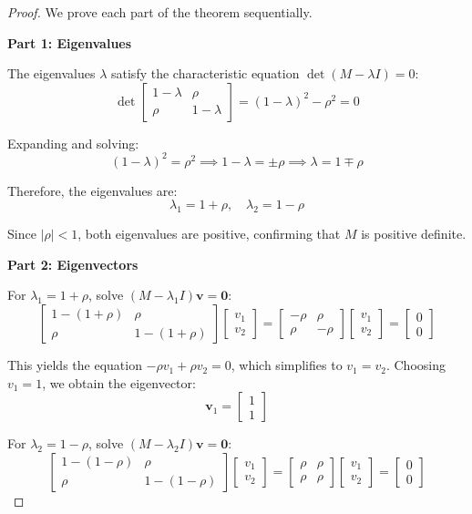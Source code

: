 \documentclass{article}
\begin{document}
\begin{proof}
We prove each part of the theorem sequentially.

\textbf{Part 1: Eigenvalues}

The eigenvalues $\lambda$ satisfy the characteristic equation $\det(M - \lambda I) = 0$:
\[
\det\begin{bmatrix} 
1-\lambda & \rho \\ 
\rho & 1-\lambda 
\end{bmatrix} = (1-\lambda)^2 - \rho^2 = 0
\]

Expanding and solving:
\[
(1-\lambda)^2 = \rho^2 \implies 1-\lambda = \pm\rho \implies \lambda = 1 \mp \rho
\]

Therefore, the eigenvalues are:
\[
\lambda_1 = 1 + \rho, \quad \lambda_2 = 1 - \rho
\]

Since $|\rho| < 1$, both eigenvalues are positive, confirming that $M$ is positive definite.

\textbf{Part 2: Eigenvectors}

For $\lambda_1 = 1 + \rho$, solve $(M - \lambda_1 I)\mathbf{v} = \mathbf{0}$:
\[
\begin{bmatrix}
1-(1+\rho) & \rho \\
\rho & 1-(1+\rho)
\end{bmatrix}
\begin{bmatrix} v_1 \\ v_2 \end{bmatrix}
=
\begin{bmatrix}
-\rho & \rho \\
\rho & -\rho
\end{bmatrix}
\begin{bmatrix} v_1 \\ v_2 \end{bmatrix}
=
\begin{bmatrix} 0 \\ 0 \end{bmatrix}
\]

This yields the equation $-\rho v_1 + \rho v_2 = 0$, which simplifies to $v_1 = v_2$. Choosing $v_1 = 1$, we obtain the eigenvector:
\[
\mathbf{v}_1 = \begin{bmatrix} 1 \\ 1 \end{bmatrix}
\]

For $\lambda_2 = 1 - \rho$, solve $(M - \lambda_2 I)\mathbf{v} = \mathbf{0}$:
\[
\begin{bmatrix}
1-(1-\rho) & \rho \\
\rho & 1-(1-\rho)
\end{bmatrix}
\begin{bmatrix} v_1 \\ v_2 \end{bmatrix}
=
\begin{bmatrix}
\rho & \rho \\
\rho & \rho
\end{bmatrix}
\begin{bmatrix} v_1 \\ v_2 \end{bmatrix}
=
\begin{bmatrix} 0 \\ 0 \end{bmatrix}
\]


\end{proof}
\end{document}
